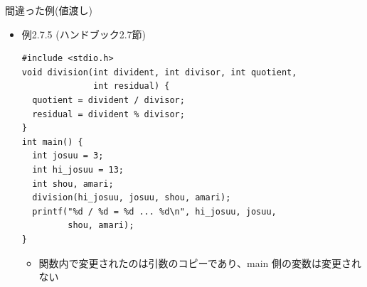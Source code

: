 \begin{frame}[t,fragile]{間違った例(値渡し)}
  \begin{itemize}
  \item 例2.7.5 (ハンドブック2.7節)
\begin{lstlisting}
#include <stdio.h>
void division(int divident, int divisor, int quotient,
              int residual) {
  quotient = divident / divisor;
  residual = divident % divisor;
}
int main() {
  int josuu = 3;
  int hi_josuu = 13;
  int shou, amari;
  division(hi_josuu, josuu, shou, amari);
  printf("%d / %d = %d ... %d\n", hi_josuu, josuu,
         shou, amari);
}
\end{lstlisting}
  \begin{itemize}
  \item 関数内で変更されたのは引数のコピーであり、main 側の変数は変更されない
  \end{itemize}
  \end{itemize}
\end{frame}
